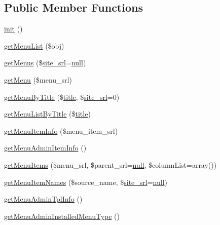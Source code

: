 \subsection*{Public Member Functions}
\begin{DoxyCompactItemize}
\item 
\hyperlink{classmenuAdminModel_a092a0da21ac0c7f76f84ec5be5eea1b7}{init} ()
\item 
\hyperlink{classmenuAdminModel_ad1a73e97dedf1b78f6780e4c17ff5100}{get\+Menu\+List} (\$obj)
\item 
\hyperlink{classmenuAdminModel_a78dfe866b68c04fd622df4d41bdce36c}{get\+Menus} (\$\hyperlink{ko_8install_8php_a8b1406b4ad1048041558dce6bfe89004}{site\+\_\+srl}=\hyperlink{modernizr_8min_8js_a286f9ec831c5e676eeb493248eab9575}{null})
\item 
\hyperlink{classmenuAdminModel_a303e32a7d98c99847035407e7ed4e951}{get\+Menu} (\$menu\+\_\+srl)
\item 
\hyperlink{classmenuAdminModel_a358509545ff88093b02be04c6599796d}{get\+Menu\+By\+Title} (\$\hyperlink{ko_8install_8php_a5b072c5fd1d2228c6ba5cee13cd142e3}{title}, \$\hyperlink{ko_8install_8php_a8b1406b4ad1048041558dce6bfe89004}{site\+\_\+srl}=0)
\item 
\hyperlink{classmenuAdminModel_a0639cb89b3292dc5ee8977423b5ac140}{get\+Menu\+List\+By\+Title} (\$\hyperlink{ko_8install_8php_a5b072c5fd1d2228c6ba5cee13cd142e3}{title})
\item 
\hyperlink{classmenuAdminModel_a5686120035966f9a44ec2fea2af191e4}{get\+Menu\+Item\+Info} (\$menu\+\_\+item\+\_\+srl)
\item 
\hyperlink{classmenuAdminModel_a12a02d8f3441f1454fe22e5b8d927de5}{get\+Menu\+Admin\+Item\+Info} ()
\item 
\hyperlink{classmenuAdminModel_a2a663607f4ded1cf71df28271ac72888}{get\+Menu\+Items} (\$menu\+\_\+srl, \$parent\+\_\+srl=\hyperlink{modernizr_8min_8js_a286f9ec831c5e676eeb493248eab9575}{null}, \$column\+List=array())
\item 
\hyperlink{classmenuAdminModel_a3a77c5cfe6cee8b008b5b960adb83d9e}{get\+Menu\+Item\+Names} (\$source\+\_\+name, \$\hyperlink{ko_8install_8php_a8b1406b4ad1048041558dce6bfe89004}{site\+\_\+srl}=\hyperlink{modernizr_8min_8js_a286f9ec831c5e676eeb493248eab9575}{null})
\item 
\hyperlink{classmenuAdminModel_a9f938b72f1488559cab19e9011ae7076}{get\+Menu\+Admin\+Tpl\+Info} ()
\item 
\hyperlink{classmenuAdminModel_a1fd1ae309603a0fc0b58589d2cc0d025}{get\+Menu\+Admin\+Installed\+Menu\+Type} ()

\end{DoxyCompactItemize}
